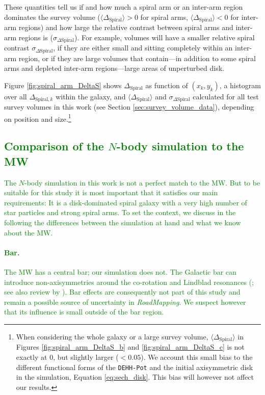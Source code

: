 \documentclass[iop,revtex4,numberedappendix,appendixfloats]{emulateapj}
\newcommand{\RM}{{\sl RoadMapping}}
\newcommand{\NEW}[1]{\textcolor{Green}{#1}}
\begin{document}
These quantities tell us if and how much a spiral arm or an inter-arm region dominates the survey volume ($\langle \Delta_\text{Spiral} \rangle > 0$ for spiral arms, $\langle \Delta_\text{Spiral} \rangle < 0$ for inter-arm regions) and how large the relative contrast between spiral arms and inter-arm regions is ($\sigma_{\Delta\text{Spiral}}$). For example, volumes will have a smaller relative spiral contrast $\sigma_{\Delta\text{Spiral}}$, if they are either small and sitting completely within an inter-arm region, or if they are large volumes that contain---in addition to some spiral arms and depleted inter-arm regions---large areas of unperturbed disk.

Figure \ref{fig:spiral_arm_DeltaS} shows $\Delta_\text{Spiral}$ as function of $(x_k,y_k)$, a histogram over all $\Delta_{\text{Spiral},k}$ within the galaxy, and $\langle \Delta_\text{Spiral} \rangle$ and $\sigma_{\Delta\text{Spiral}}$ calculated for all test survey volumes in this work (see Section \ref{sec:survey_volume_data}), depending on position and size.\footnote{When considering the whole galaxy or a large survey volume, $\langle \Delta_\text{Spiral} \rangle$ in Figures \ref{fig:spiral_arm_DeltaS_b} and \ref{fig:spiral_arm_DeltaS_c} is not exactly at $0$, but slightly larger ($<0.05$). We account this small bias to the different functional forms of the \texttt{DEHH-Pot} and the initial axisymmetric disk in the simulation, Equation \eqref{eq:sech_disk}. This bias will however not affect our results.}

\subsection{\NEW{Comparison of the $N$-body simulation to the MW}} \label{sec:comparison_with_MW}

\NEW{The $N$-body simulation in this work is not a perfect match to the MW. But to be suitable for this study it is most important that it satisfies our main requirements:  It is a disk-dominated spiral galaxy with a very high number of star particles and strong spiral arms. To set the context, we discuss in the following the differences between the simulation at hand and what we know about the MW.}

\NEW{\paragraph{Bar.} The MW has a central bar; our simulation does not. The Galactic bar can introduce non-axisymmetries around the co-rotation and Lindblad resonances (\citealt{2000AJ....119..800D,2001A&A...373..511F,2003AJ....125..785Q,2005AJ....130..576Q,2010MNRAS.409..145S,2010ApJ...722..112M,2017MNRAS.466L.113M}; see also review by \citealt{2011MSAIS..18..185G}). Bar effects are consequently not part of this study and remain a possible source of uncertainty  in \RM{}. We suspect however that its influence is small outside of the bar region.}
\end{document}
